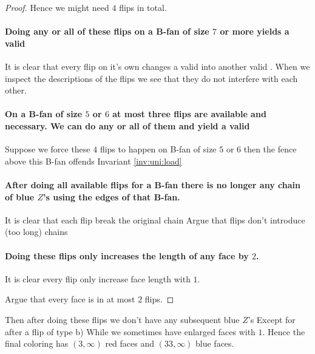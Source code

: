 \begin{proof}
  Hence we might need $4$ flips in total.

  \paragraph{Doing any or all of these flips on a B-fan of size $7$ or more yields a valid \rel}
  It is clear that every flip on it's own changes a valid \rel into another valid \rel.
  When we inspect the descriptions of the flips we see that they do not interfere with each other.

  \paragraph{On a B-fan of size $5$ or $6$ at most three flips are available and necessary. We can do any or all of them and yield a valid \rel}
  Suppose we force these $4$ flips to happen on B-fan of size $5$ or $6$ then the fence above this B-fan offends Invariant \ref{inv:uni:load}


  \paragraph{After doing all available flips for a B-fan there is no longer any chain of blue $Z$'s using the edges of that B-fan.}
  It is clear that each flip break the original chain
  Argue that flips don't introduce (too long) chains

  \paragraph{Doing these flips only increases the length of any face by $2$.}
  It is clear every flip only increase face length with $1$.

  Argue that every face is in at most $2$ flips.



\end{proof}


Then after doing these flips we don't have any subsequent blue $Z$'s Except for after a flip of type b) While we sometimes have enlarged faces with $1$.  Hence the final coloring has $(3, \infty)$ red faces and $(33, \infty)$ blue faces.
